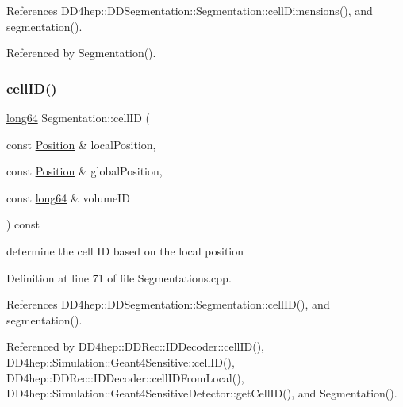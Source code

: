 References D\+D4hep\+::\+D\+D\+Segmentation\+::\+Segmentation\+::cell\+Dimensions(), and segmentation().



Referenced by Segmentation().

\hypertarget{class_d_d4hep_1_1_geometry_1_1_segmentation_a39785430e3bf6f2de6df12f94cdcafe1}{}\label{class_d_d4hep_1_1_geometry_1_1_segmentation_a39785430e3bf6f2de6df12f94cdcafe1} 
\subsubsection{\texorpdfstring{cell\+I\+D()}{cellID()}}
{\footnotesize\ttfamily \hyperlink{namespace_d_d4hep_ac2a70e722b33dc7ddaa20db8954ac836}{long64} Segmentation\+::cell\+ID (\begin{DoxyParamCaption}\item[{const \hyperlink{namespace_d_d4hep_1_1_geometry_a55083902099d03506c6db01b80404900}{Position} \&}]{local\+Position,  }\item[{const \hyperlink{namespace_d_d4hep_1_1_geometry_a55083902099d03506c6db01b80404900}{Position} \&}]{global\+Position,  }\item[{const \hyperlink{namespace_d_d4hep_ac2a70e722b33dc7ddaa20db8954ac836}{long64} \&}]{volume\+ID }\end{DoxyParamCaption}) const}



determine the cell ID based on the local position 



Definition at line 71 of file Segmentations.\+cpp.



References D\+D4hep\+::\+D\+D\+Segmentation\+::\+Segmentation\+::cell\+I\+D(), and segmentation().



Referenced by D\+D4hep\+::\+D\+D\+Rec\+::\+I\+D\+Decoder\+::cell\+I\+D(), D\+D4hep\+::\+Simulation\+::\+Geant4\+Sensitive\+::cell\+I\+D(), D\+D4hep\+::\+D\+D\+Rec\+::\+I\+D\+Decoder\+::cell\+I\+D\+From\+Local(), D\+D4hep\+::\+Simulation\+::\+Geant4\+Sensitive\+Detector\+::get\+Cell\+I\+D(), and Segmentation().

\hypertarget{class_d_d4hep_1_1_geometry_1_1_segmentation_acab8b5976de44a26178bab5b9b92dad7}{}\label{class_d_d4hep_1_1_geometry_1_1_segmentation_acab8b5976de44a26178bab5b9b92dad7} 
